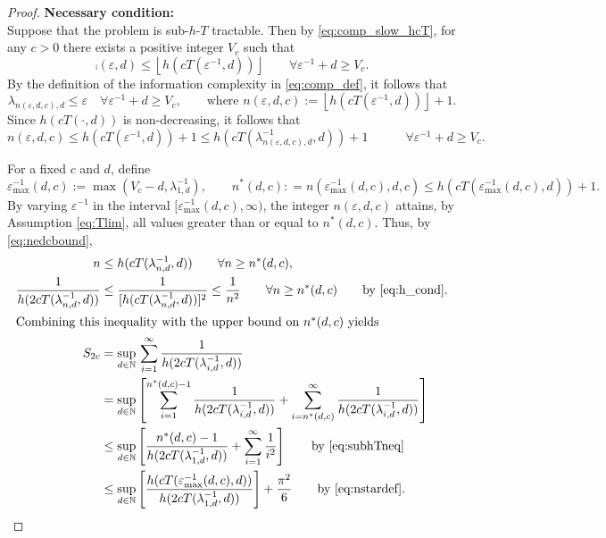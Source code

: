 \documentclass[sort&compress]{elsarticle}
\begin{document}
\begin{proof}
\bigskip

\noindent \textbf{Necessary condition:}\\
Suppose that the problem is  sub-$h$-$T$ tractable. Then by \eqref{eq:comp_slow_hcT}, for any $c>0$ there exists a positive integer $V_c$ such that
\begin{equation*}
	\comp(\varepsilon,d) \le \left\lfloor h(cT(\varepsilon^{-1},d)) \right\rfloor \qquad \forall \varepsilon^{-1} + d \ge V_c.
\end{equation*}
By the definition of the information complexity in \eqref{eq:comp_def}, it follows that
\[
	\lambda_{n(\varepsilon,d,c),d} \le \varepsilon \quad \forall \varepsilon^{-1} + d \ge V_c, \qquad \text{where }
	n(\varepsilon,d,c):=\left\lfloor h(cT(\varepsilon^{-1},d)) \right\rfloor +1.
\]
Since $h(cT(\cdot,d))$ is non-decreasing, it follows that
\begin{equation}
		n(\varepsilon,d,c)\le  h(cT(\varepsilon^{-1},d)) +1\le  h(cT(\lambda^{-1}_{n(\varepsilon,d,c),d},d)) +1\qquad  \quad \forall \varepsilon^{-1} + d \ge V_c. \label{eq:nedcbound}
\end{equation}


For a fixed $c$ and $d$, define
\begin{equation} \label{eq:nstardef}
	\varepsilon^{-1}_{\max}(d,c) := \max(V_c - d,\lambda_{1,d}^{-1}), \qquad n^*(d,c) : = n(\varepsilon^{-1}_{\max}(d,c),d,c) \le h(cT(\varepsilon^{-1}_{\max}(d,c),d)) +1.
\end{equation}
By varying $\varepsilon^{-1}$ in the interval $[\varepsilon^{-1}_{\max}(d,c),\infty)$,  the integer $n(\varepsilon,d,c)$ attains, by Assumption \eqref{eq:Tlim}, all values greater than or equal to $n^*(d,c)$.  Thus, by \eqref{eq:nedcbound},
\begin{align}
		n &\le h(cT(\lambda^{-1}_{n,d},d)) \qquad  \forall n \ge n^*(d,c), \label{eq:subhTneq}\\
		\nonumber
		\frac{1}{h(2 cT(\lambda^{-1}_{n,d},d)) } & \le \frac{1}{[h(cT(\lambda^{-1}_{n,d},d))]^{2}}  \le \frac 1{n^2}   \qquad  \forall n \ge n^*(d,c) \qquad \text{by \eqref{eq:h_cond}}. \\
		\intertext{Combining this inequality with the upper bound on $n^*(d,c)$ yields}
		\nonumber
		S_{2c} & =\sup_{d\in\mathbb{N}}  \, \sum_{i=1}^\infty \frac1{h(2cT(\lambda_{i,d}^{-1},d))} \\
		\nonumber
		&  = \sup_{d\in\mathbb{N}} \left [
		\sum_{i=1}^{n^*(d,c)-1} \frac1{h(2cT(\lambda_{i,d}^{-1},d))}
		+ \sum_{i=n^*(d,c)}^\infty \frac1{h(2cT(\lambda_{i,d}^{-1},d))}
		\right]\\
		 \nonumber
		 & \le \sup_{d\in\mathbb{N}} \left [
\frac{n^*(d,c)-1}{h(2cT(\lambda_{1,d}^{-1},d))}
+ \sum_{i=1}^\infty \frac1{i^2}
\right]
 \qquad \text{by \eqref{eq:subhTneq}}\\
 \label{eq:lastone}
		 & \le \sup_{d\in\mathbb{N}} \left [
		 \frac{ h(cT(\varepsilon^{-1}_{\max}(d,c),d))}{h(2cT(\lambda_{1,d}^{-1},d))}
		\right] + \frac{\pi^2}{6}
		\qquad \text{by \eqref{eq:nstardef}.}
\end{align}


\end{proof}
\end{document}
